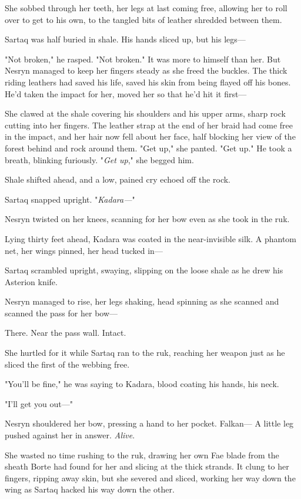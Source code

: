 She sobbed through her teeth, her legs at last coming free, allowing her to roll over to get to his own, to the tangled bits of leather shredded between them.

Sartaq was half buried in shale.
His hands sliced up, but his legs---

"Not broken," he rasped.
"Not broken."
It was more to himself than her.
But Nesryn managed to keep her fingers steady as she freed the buckles.
The thick riding leathers had saved his life, saved his skin from being flayed off his bones.
He'd taken the impact for her, moved her so that he'd hit it first---

She clawed at the shale covering his shoulders and his upper arms, sharp rock cutting into her fingers.
The leather strap at the end of her braid had come free in the impact, and her hair now fell about her face, half blocking her view of the forest behind and rock around them.
"Get up," she panted.
"Get up."
He took a breath, blinking furiously.
"\emph{Get up}," she begged him.

Shale shifted ahead, and a low, pained cry echoed off the rock.

Sartaq snapped upright.
"\emph{Kadara---}"

Nesryn twisted on her knees, scanning for her bow even as she took in the ruk.

Lying thirty feet ahead, Kadara was coated in the near-invisible silk.
A phantom net, her wings pinned, her head tucked in---

Sartaq scrambled upright, swaying, slipping on the loose shale as he drew his Asterion knife.

Nesryn managed to rise, her legs shaking, head spinning as she scanned and scanned the pass for her bow---

There.
Near the pass wall.
Intact.

She hurtled for it while Sartaq ran to the ruk, reaching her weapon just as he sliced the first of the webbing free.

"You'll be fine," he was saying to Kadara, blood coating his hands, his neck.

"I'll get you out---"

Nesryn shouldered her bow, pressing a hand to her pocket.
Falkan--- A little leg pushed against her in answer.
\emph{Alive}.

She wasted no time rushing to the ruk, drawing her own Fae blade from the sheath Borte had found for her and slicing at the thick strands.
It clung to her fingers, ripping away skin, but she severed and sliced, working her way down the wing as Sartaq hacked his way down the other.

